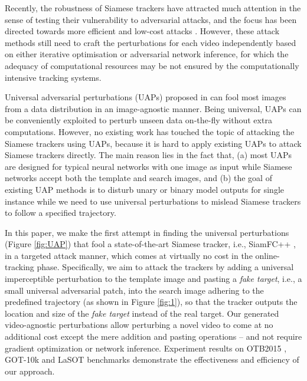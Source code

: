 \documentclass[journal]{IEEEtran}
\newcommand{\ie}{i.e.}
\begin{document}
Recently, the robustness of Siamese trackers have attracted much attention in the sense of testing their vulnerability to adversarial attacks, and the focus has been directed towards more efficient and low-cost attacks \cite{TTP,FAN,SPARK}. However, these attack methods still need to craft the perturbations for each video independently based on either iterative optimisation or adversarial network inference, for which the adequacy of computational resources may be not ensured by the computationally intensive tracking systems. 

Universal adversarial perturbations (UAPs) proposed in \cite{UAP} can fool most images from a data distribution in an image-agnostic manner. Being universal, UAPs can be conveniently exploited to perturb unseen data on-the-fly without extra computations. However, no existing work has touched the topic of attacking the Siamese trackers using UAPs, because it is hard to apply existing UAPs to attack Siamese trackers directly. The main reason lies in the fact that, (a) most UAPs are designed for typical neural networks with one image as input while Siamese networks accept both the template and search images, and (b) the goal of existing UAP methods is to disturb unary or binary model outputs for single instance while we need to use universal perturbations to mislead Siamese trackers to follow a specified trajectory.
  
In this paper, we make the first attempt in finding the universal perturbations (Figure \ref{fig:UAP}) that fool a state-of-the-art Siamese tracker, \ie, SiamFC++ \cite{SiamFC++}, in a targeted attack manner, which comes at virtually no cost in the online-tracking phase. Specifically, we aim to attack the trackers by adding a universal imperceptible perturbation to the template image and pasting a \textit{fake target}, \ie, a small universal adversarial patch, into the search image adhering to the predefined trajectory (as shown in Figure \ref{fig:1}), so that the tracker outputs the location and size of the \textit{fake target} instead of the real target. Our generated video-agnostic perturbations allow perturbing a novel video to come at no additional cost except the mere addition and pasting operations -- and not require gradient optimization or network inference. Experiment results on OTB2015 \cite{OTB}, GOT-10k \cite{GOT-10k} and LaSOT \cite{GOT-10k} benchmarks demonstrate the effectiveness and efficiency of our approach.
\end{document}
